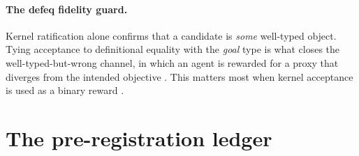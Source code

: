 \paragraph{The defeq fidelity guard.}
Kernel ratification alone confirms that a candidate is \emph{some} well-typed
object.
Tying acceptance to definitional equality with the \emph{goal} type is what
closes the well-typed-but-wrong channel, in which an agent is rewarded for a
proxy that diverges from the intended objective
\citep{skalse2022rewardhacking}.
This matters most when kernel acceptance is used as a binary reward
\citep{lambert2024tulu3}.

\section{The pre-registration ledger}
\label{app:ledger}

